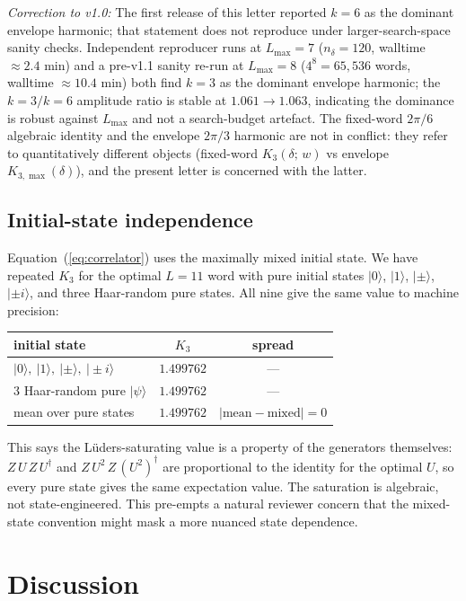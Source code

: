 \documentclass[aps,prx,reprint,amsmath,amssymb,floatfix,nofootinbib,superscriptaddress]{revtex4-2}
\begin{document}
\emph{Correction to v1.0:} The first release of this letter reported
$k=6$ as the dominant envelope harmonic; that statement does not
reproduce under larger-search-space sanity checks. Independent
reproducer runs at $L_{\max} = 7$ ($n_{\delta} = 120$, walltime
$\approx 2.4$ min) and a pre-v1.1 sanity re-run at $L_{\max} = 8$
($4^{8} = 65{,}536$ words, walltime $\approx 10.4$ min) both find
$k=3$ as the dominant envelope harmonic; the $k=3 / k=6$ amplitude
ratio is stable at $1.061 \to 1.063$, indicating the dominance is
robust against $L_{\max}$ and not a search-budget artefact. The
fixed-word $2\pi/6$ algebraic identity and the envelope $2\pi/3$
harmonic are not in conflict: they refer to quantitatively
different objects (fixed-word $K_{3}(\delta;\,w)$ vs envelope
$K_{3,\max}(\delta)$), and the present letter is concerned with
the latter.

\subsection{Initial-state independence}

Equation~(\ref{eq:correlator}) uses the maximally mixed initial state.
We have repeated $K_{3}$ for the optimal $L=11$ word with pure initial
states $|0\rangle$, $|1\rangle$, $|\pm\rangle$, $|\pm i\rangle$, and
three Haar-random pure states. All nine give the same value to
machine precision:
\begin{center}\small
\begin{tabular}{lcc}
\toprule
initial state & $K_{3}$ & spread \\
\midrule
$|0\rangle,\ |1\rangle,\ |\pm\rangle,\ |\pm i\rangle$
              & $1.499762$ & --- \\
$3$ Haar-random pure $|\psi\rangle$
              & $1.499762$ & --- \\
\midrule
mean over pure states & $1.499762$ &
        $|\text{mean}-\text{mixed}| = 0$ \\
\bottomrule
\end{tabular}
\end{center}
This says the L\"uders-saturating value is a property of the
generators themselves: $Z\,U\,Z\,U^{\dagger}$ and $Z\,U^{2}\,Z\,(U^{2})^{\dagger}$
are proportional to the identity for the optimal $U$, so every pure
state gives the same expectation value. The saturation is algebraic,
not state-engineered. This pre-empts a natural reviewer concern that
the mixed-state convention might mask a more nuanced state dependence.

\section{Discussion}
\label{sec:discussion}
\end{document}

